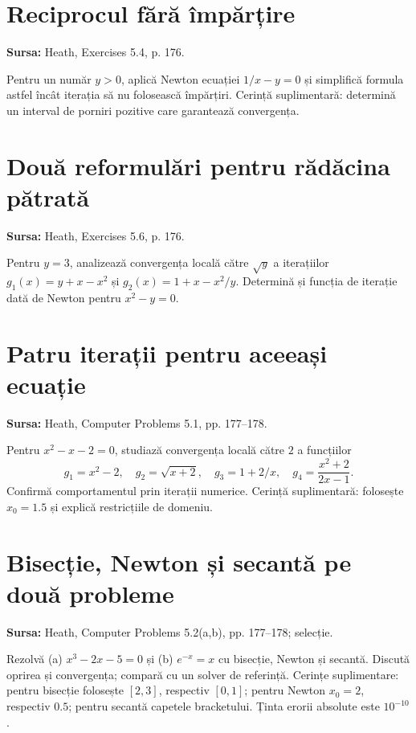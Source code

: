 \documentclass[11pt,a4paper]{article}
\begin{document}
\section{Reciprocul fără împărțire}
\textbf{Sursa:} Heath, Exercises 5.4, p. 176.

Pentru un număr $y>0$, aplică Newton ecuației $1/x-y=0$ și simplifică formula astfel încât iterația să nu folosească împărțiri. Cerință suplimentară: determină un interval de porniri pozitive care garantează convergența.



\section{Două reformulări pentru rădăcina pătrată}
\textbf{Sursa:} Heath, Exercises 5.6, p. 176.

Pentru $y=3$, analizează convergența locală către $\sqrt y$ a iterațiilor $g_1(x)=y+x-x^2$ și $g_2(x)=1+x-x^2/y$. Determină și funcția de iterație dată de Newton pentru $x^2-y=0$.



\section{Patru iterații pentru aceeași ecuație}
\textbf{Sursa:} Heath, Computer Problems 5.1, pp. 177--178.

Pentru $x^2-x-2=0$, studiază convergența locală către $2$ a funcțiilor
\[g_1=x^2-2,\quad g_2=\sqrt{x+2},\quad g_3=1+2/x,\quad g_4=\frac{x^2+2}{2x-1}.\]
Confirmă comportamentul prin iterații numerice. Cerință suplimentară: folosește $x_0=1.5$ și explică restricțiile de domeniu.



\section{Bisecție, Newton și secantă pe două probleme}
\textbf{Sursa:} Heath, Computer Problems 5.2(a,b), pp. 177--178; selecție.

Rezolvă (a) $x^3-2x-5=0$ și (b) $e^{-x}=x$ cu bisecție, Newton și secantă. Discută oprirea și convergența; compară cu un solver de referință. Cerințe suplimentare: pentru bisecție folosește $[2,3]$, respectiv $[0,1]$; pentru Newton $x_0=2$, respectiv $0.5$; pentru secantă capetele bracketului. Ținta erorii absolute este $10^{-10}$.
\end{document}
